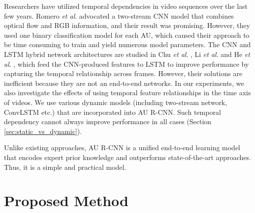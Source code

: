 \documentclass[5p,twocolumn]{elsarticle}
\makeatletter
\newcommand{\etal}{\textit{et al}. }
\def\etc{etc.\@\xspace}
\makeatother
\begin{document}
Researchers have utilized temporal dependencies in video sequences over the last few years. Romero \etal \cite{romero2017multi} advocated a two-stream CNN model that combines optical flow and RGB information, and their result was promising. However, they used one binary classification model for each AU, which caused their approach to be time consuming to train and yield numerous model parameters. The CNN and LSTM hybrid network architectures are studied in Chu \etal \cite{Chu2017Learning}, Li \etal \cite{li2017action} and He \etal \cite{he2017multi}, which feed the CNN-produced features to LSTM to improve performance by capturing the temporal relationship across frames. However, their solutions are inefficient because they are not an end-to-end networks.
In our experiments, we also investigate the effects of using temporal feature relationships in the time axis of videos. We use various dynamic models (including two-stream network, ConvLSTM \etc) that are incorporated into AU R-CNN. Such temporal dependency cannot always improve performance in all cases (Section \ref{sec:static_vs_dynamic}).

Unlike existing approaches, AU R-CNN is a unified end-to-end learning model that encodes expert prior knowledge and outperforms state-of-the-art approaches. Thus, it is a simple and practical model.


\section{Proposed Method}
\end{document}
